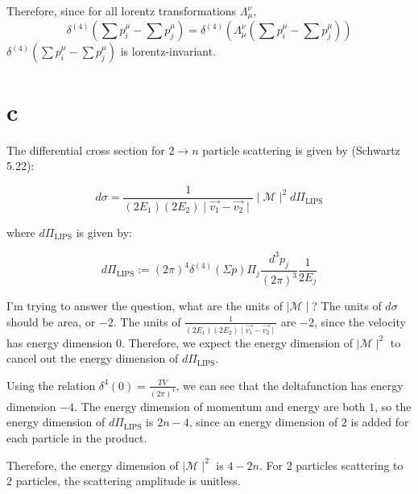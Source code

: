 \documentclass{article}
\begin{document}
Therefore, since for all lorentz transformations $\Lambda_\mu^\nu$,
$$\delta^{(4)}( \sum p_i^\mu - \sum p_j^\mu ) = 
	\delta^{(4)}( \Lambda_\mu^\nu ( \sum p_i^\mu - \sum p_j^\mu )) $$
	$\delta^{(4)}( \sum p_i^\mu - \sum p_j^\mu )$
	is lorentz-invariant.

\section{c}

The differential cross section for $2 \to n$ particle scattering
	is given by (Schwartz 5.22):

$$ d\sigma =
	\frac{1}{(2 E_1) (2 E_2) \mid \vec{v_1} - \vec{v_2} \mid}
	\mid \mathcal{M} \mid^2
	d\Pi_{\text{LIPS}}
$$

where $d\Pi_{\text{LIPS}}$ is given by:

$$ d\Pi_{\text{LIPS}} := (2 \pi)^4 \delta^{(4)}(\Sigma p) 
	\Pi_j  \frac{d^3 p_j}{(2 \pi)^3} 
		\frac{1}{2 E_j}
$$

I'm trying to answer the question, what are the units of $\mid \mathcal{M} \mid$?
The units of $d\sigma$ should be area, or $-2$.
The units of $\frac{1}{(2 E_1) (2 E_2) \mid \vec{v_1} - \vec{v_2} \mid}$
	are $-2$, since the velocity has energy dimension $0$.
Therefore, we expect the energy dimension of $\mid \mathcal{M} \mid^2$
	to cancel out the energy dimension of $d\Pi_{\text{LIPS}}$.

Using the relation $\delta^4(0) = \frac{T V}{(2 \pi)^4}$,
	we can see that the deltafunction has energy dimension $-4$.
The energy dimension of momentum and energy are both $1$,
	so the energy dimension of $d\Pi_{\text{LIPS}}$
	is $2 n - 4$, since an energy dimension of $2$
	is added for each particle in the product.

Therefore, the energy dimension of $\mid \mathcal{M} \mid^2$
	is $4 - 2 n$.
For 2 particles scattering to 2 particles, the scattering amplitude is unitless.
\end{document}
